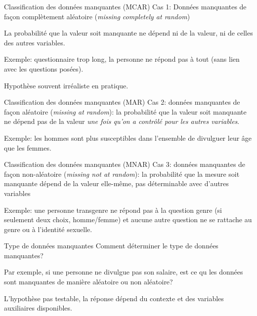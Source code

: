 \documentclass[
  ignorenonframetext,
]{beamer}
\begin{document}
\begin{frame}{Classification des données manquantes (MCAR)}
\protect\hypertarget{classification-des-donnuxe9es-manquantes-mcar}{}
Cas 1: Données manquantes de façon complètement aléatoire (\emph{missing
completely at random})

La probabilité que la valeur soit manquante ne dépend ni de la valeur,
ni de celles des autres variables.

Exemple: questionnaire trop long, la personne ne répond pas à tout (sans
lien avec les questions posées).

Hypothèse souvent irréaliste en pratique.
\end{frame}

\begin{frame}{Classification des données manquantes (MAR)}
\protect\hypertarget{classification-des-donnuxe9es-manquantes-mar}{}
Cas 2: données manquantes de façon aléatoire (\emph{missing at random}):
la probabilité que la valeur soit manquante ne dépend pas de la valeur
\emph{une fois qu'on a contrôlé pour les autres variables}.

Exemple: les hommes sont plus susceptibles dans l'ensemble de divulguer
leur âge que les femmes.
\end{frame}

\begin{frame}{Classification des données manquantes (MNAR)}
\protect\hypertarget{classification-des-donnuxe9es-manquantes-mnar}{}
Cas 3: données manquantes de façon non-aléatoire (\emph{missing not at
random}): la probabilité que la mesure soit manquante dépend de la
valeur elle-même, pas déterminable avec d'autres variables

Exemple: une personne transgenre ne répond pas à la question genre (si
seulement deux choix, homme/femme) et aucune autre question ne se
rattache au genre ou à l'identité sexuelle.
\end{frame}

\begin{frame}{Type de données manquantes}
\protect\hypertarget{type-de-donnuxe9es-manquantes}{}
Comment déterminer le type de données manquantes?

Par exemple, si une personne ne divulgue pas son salaire, est ce qu les
données sont manquantes de manière aléatoire ou non aléatoire?

L'hypothèse pas testable, la réponse dépend du contexte et des variables
auxiliaires disponibles.
\end{frame}
\end{document}
